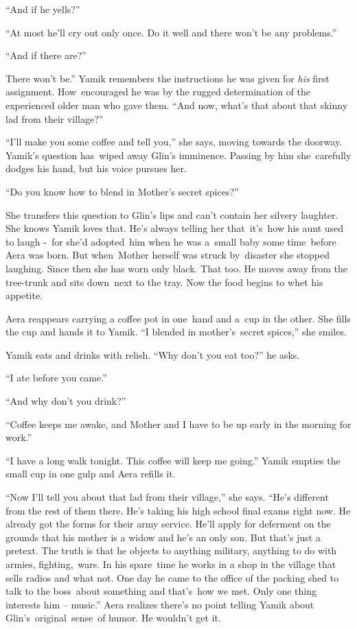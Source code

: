 \documentclass[twoside,11pt]{book}
\begin{document}
{}``And if he yells?'' 

{}``At most he'll cry out only once. Do it well and there won't be any problems.'' 

{}``And if there are?'' 

{\textquotedbl}There won't be.'' Yamik remembers the instructions he was given for \textit{his} first assignment.
How\ encouraged he was by the rugged determination of the experienced older man who gave them. ``And now, what's that
about that skinny lad from their village?'' 

{}``I'll make you some coffee and tell you,{}'' she says, moving towards the doorway. Yamik's question has~wiped away
Glin's {imminence}. Passing by him she\ carefully dodges his hand, but his voice pursues her.\ 

{}``Do you know how to blend in Mother's secret spices?'' 

She transfers this question to Glin's lips and can't contain her silvery laughter. She knows Yamik loves that. He{}'s
always telling her that\ it's\ how his aunt used to laugh -\  for she{}'d adopted\ him when he was a\ small baby some
time\ before Aera was born. But when\ Mother herself was struck by\ disaster she stopped laughing. Since then she has
worn only black. That too. He moves away from the tree-trunk and sits down\ next to the tray. Now the food begins to
whet his appetite.\ 

Aera reappears carrying a coffee pot in one~hand and a~cup in the other. She fills the cup and hands it to Yamik. ``I
blended in mother's~secret spices,'' she smiles.~ 

Yamik eats and drinks with relish. ``Why don't you eat too?'' he asks. 

{}``I ate before you came.'' 

{}``And why don't you drink?'' 

{}``Coffee keeps me awake, and Mother and I have to be up early in the morning for work.'' 

{}``I have a long walk tonight. This coffee will keep me going.'' Yamik empties the small cup in one gulp and Aera
refills it. 

{}``Now I'll tell you about that lad from their village,'' she says. {}``He's different from the rest of them there.
He{}'s taking his high school final exams right now. He already got the forms for their army service. He'll apply for
deferment on the grounds that his mother is a widow and he's an only son. But that's just a pretext. The truth is that
he objects to anything military, anything to do with armies, fighting,~wars. In his spare\ time he works in a shop in
the village that sells radios and what not. One day he came to the office of the packing shed to talk to the
boss\ about something and that's~how we met. Only one thing interests him -- music.'' Aera realizes there's no point
telling Yamik about Glin's\ original{\ }sense\ of humor. He wouldn't get it. 
\end{document}
